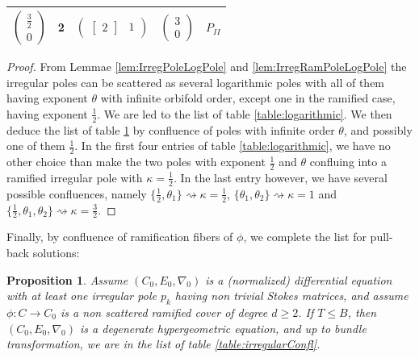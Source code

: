 \documentclass[12]{amsart}
\newtheorem{prop}[thm]{Proposition}
\begin{document}
\begin{table}[h]
\begin{center}
\begin{tabular}{|c|c|c|c|c|}
\hline
$\begin{pmatrix}\frac{3}{2}\\ 0\end{pmatrix}$ & 2 &
$\begin{pmatrix}    \left[\begin{matrix}2\end{matrix}\right] &   1\end{pmatrix}$ &
$\begin{pmatrix}3\\ 0\end{pmatrix}$& $P_{II}$\\
\hline
\end{tabular}
\end{center}
\label{table:irregular}
\end{table}

\begin{proof}From Lemmae \ref{lem:IrregPoleLogPole} and  \ref{lem:IrregRamPoleLogPole} the irregular
poles can be scattered as several logarithmic poles with all of them having exponent $\theta$ with infinite
orbifold order, except one in the ramified case, having exponent $\frac{1}{2}$. We are led to the list of table
\ref{table:logarithmic}. We then deduce the list of table \ref{table:irregular} by confluence of poles with 
infinite order $\theta$, and possibly one of them $\frac{1}{2}$. In the first four entries of table \ref{table:logarithmic},
we have no other choice than make the two poles with exponent $\frac{1}{2}$ and $\theta$ confluing into
a ramified irregular pole with $\kappa=\frac{1}{2}$. In the last entry however, we have several possible 
confluences, namely $\{\frac{1}{2},\theta_1\}\rightsquigarrow \kappa=\frac{1}{2}$, $\{\theta_1,\theta_2\}\rightsquigarrow \kappa=1$ and $\{\frac{1}{2},\theta_1,\theta_2\}\rightsquigarrow \kappa=\frac{3}{2}$.
\end{proof}


Finally, by confluence of ramification fibers of $\phi$, we complete the list for pull-back solutions:

\begin{prop}\label{prop:classificationIrregConfl}
Assume $(C_0,E_0,\nabla_0)$ is a (normalized) differential equation
with at least one irregular pole $p_k$ having non trivial Stokes matrices, and assume 
$\phi:C\to C_0$ is a non scattered ramified cover of degree $d\ge 2$. If $T\le B$, 
then $(C_0,E_0,\nabla_0)$ is a degenerate hypergeometric equation,
and up to bundle transformation, we are in the list of table \ref{table:irregularConfl}.
\end{prop}
\end{document}
